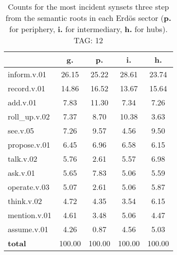 \begin{table}[h!]
\begin{center}
\begin{tabular}{| l || c | c | c | c |}\hline
 & {\bf g.} & {\bf p.} & {\bf i.} & {\bf h.} \\\hline\hline
inform.v.01 & 26.15  & 25.22  & 28.61  & 23.74 \\\hline
record.v.01 & 14.86  & 16.52  & 13.67  & 15.64 \\\hline
add.v.01 & 7.83  & 11.30  & 7.34  & 7.26 \\\hline
roll\_up.v.02 & 7.37  & 8.70  & 10.38  & 3.63 \\\hline
see.v.05 & 7.26  & 9.57  & 4.56  & 9.50 \\\hline
propose.v.01 & 6.45  & 6.96  & 6.58  & 6.15 \\\hline
talk.v.02 & 5.76  & 2.61  & 5.57  & 6.98 \\\hline
ask.v.01 & 5.65  & 7.83  & 5.06  & 5.59 \\\hline
operate.v.03 & 5.07  & 2.61  & 5.06  & 5.87 \\\hline
think.v.02 & 4.72  & 4.35  & 3.54  & 6.15 \\\hline
mention.v.01 & 4.61  & 3.48  & 5.06  & 4.47 \\\hline
assume.v.01 & 4.26  & 0.87  & 4.56  & 5.03 \\\hline\hline
{{\bf total}} & 100.00  & 100.00  & 100.00  & 100.00 \\\hline
\end{tabular}
\caption{Counts for the most incident synsets three step from the semantic roots in each Erd\"os sector ({\bf p.} for periphery, {\bf i.} for intermediary, {\bf h.} for hubs). TAG: 12}
\end{center}
\end{table}